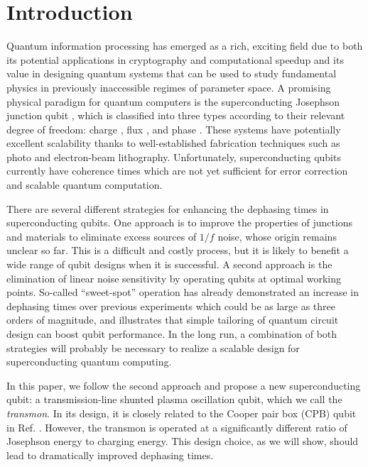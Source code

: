 \documentclass[twocolumn,amsmath,amssymb,floatfix,pra,showpacs,eqsecnum,footinbib,superscriptaddress]{revtex4}
\begin{document}
\section{Introduction} 
Quantum information processing has emerged as a rich, exciting field due to both its potential applications in cryptography \cite{gisin} and computational speedup \cite{shor,deutsch,grover} and its value in designing quantum systems that can be used to study fundamental physics in previously inaccessible regimes of parameter space.  A promising physical paradigm for quantum computers is the superconducting Josephson junction qubit \cite{makhlin,devoret1,you}, which is classified into three types according to their relevant degree of freedom: charge \cite{bouchiat,nakamura}, flux \cite{friedman,wal}, and phase \cite{martinis}.  These systems have potentially excellent scalability thanks to well-established fabrication techniques such as photo and electron-beam lithography.  Unfortunately, superconducting qubits currently have coherence times which are not yet sufficient for error correction and scalable quantum computation.

There are several different strategies for enhancing the dephasing times in superconducting qubits. One approach \cite{martinis2} is to improve the properties of junctions and materials to eliminate excess sources of $1/f$ noise, whose origin remains unclear so far. This is a difficult and costly process, but it is likely to benefit a wide range of qubit designs when it is successful. A second approach is the elimination of linear noise sensitivity by operating qubits at optimal working points. So-called ``sweet-spot'' operation has already demonstrated \cite{vion3} an increase in dephasing times over previous experiments \cite{nakamura} which could be as large as three orders of magnitude, and illustrates that simple tailoring of quantum circuit design can boost qubit performance. In the long run, a combination of both strategies will probably be necessary to realize a scalable design for superconducting quantum computing.

In this paper, we follow the second approach and propose a new superconducting qubit: a transmission-line shunted plasma oscillation qubit,  which we call the \emph{transmon}.  In its design, it is closely related to the Cooper pair box (CPB) qubit in Ref. \cite{bouchiat}.  However, the transmon is operated at a significantly different ratio of Josephson energy to charging energy. This design choice, as we will show, should lead to dramatically improved dephasing times.
\end{document}
